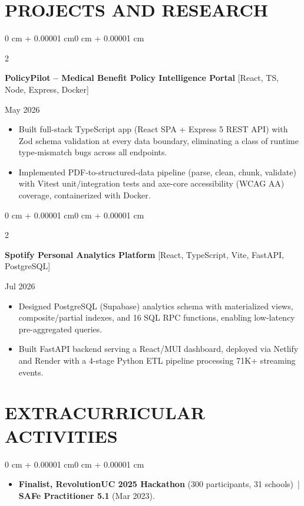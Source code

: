 \documentclass[10pt, letterpaper]{article}
\newenvironment{highlights}{
    \begin{itemize}[
        topsep=0.10 cm,
        parsep=0.06 cm,
        partopsep=0pt,
        itemsep=0.06 cm,
        leftmargin=12pt
    ]
}{
    \end{itemize}
}
\newenvironment{onecolentry}{
    \begin{adjustwidth}{0 cm + 0.00001 cm}{0 cm + 0.00001 cm}
}{
    \end{adjustwidth}
}
\newenvironment{twocolentry}[2][]{
    \onecolentry
    \def\secondColumn{#2}
    \setcolumnwidth{\fill, 4.5 cm}
    \begin{paracol}{2}
}{
    \switchcolumn \raggedleft \secondColumn
    \end{paracol}
    \endonecolentry
}
\begin{document}
\section{PROJECTS AND RESEARCH}
\begin{twocolentry}{May 2026}
\textbf{PolicyPilot -- Medical Benefit Policy Intelligence Portal} [React, TS, Node, Express, Docker]
\end{twocolentry}
\begin{highlights}
  \item Built full-stack TypeScript app (React SPA + Express 5 REST API) with Zod schema validation at every data boundary, eliminating a class of runtime type-mismatch bugs across all endpoints.
  \item Implemented PDF-to-structured-data pipeline (parse, clean, chunk, validate) with Vitest unit/integration tests and axe-core accessibility (WCAG AA) coverage, containerized with Docker.
\end{highlights}

\vspace{0.12 cm}

\begin{twocolentry}{Jul 2026}
\textbf{Spotify Personal Analytics Platform} [React, TypeScript, Vite, FastAPI, PostgreSQL]
\end{twocolentry}
\begin{highlights}
  \item Designed PostgreSQL (Supabase) analytics schema with materialized views, composite/partial indexes, and 16 SQL RPC functions, enabling low-latency pre-aggregated queries.
  \item Built FastAPI backend serving a React/MUI dashboard, deployed via Netlify and Render with a 4-stage Python ETL pipeline processing 71K+ streaming events.
\end{highlights}

\section{EXTRACURRICULAR ACTIVITIES}
\begin{onecolentry}
\begin{highlights}
  \item \textbf{Finalist, RevolutionUC 2025 Hackathon} (300 participants, 31 schools) \,|\, \textbf{SAFe Practitioner 5.1} (Mar 2023).
\end{highlights}
\end{onecolentry}
\end{document}
